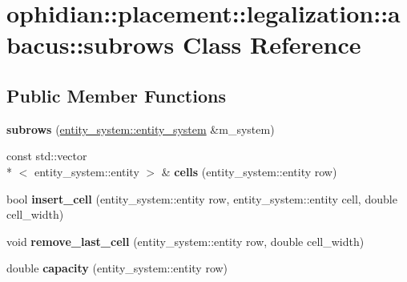 \hypertarget{classophidian_1_1placement_1_1legalization_1_1abacus_1_1subrows}{\section{ophidian\-:\-:placement\-:\-:legalization\-:\-:abacus\-:\-:subrows Class Reference}
\label{classophidian_1_1placement_1_1legalization_1_1abacus_1_1subrows}
}
\subsection*{Public Member Functions}
\begin{DoxyCompactItemize}
\item 
\hypertarget{classophidian_1_1placement_1_1legalization_1_1abacus_1_1subrows_ab568813c17e78b70616163d49576c6e0}{{\bfseries subrows} (\hyperlink{classophidian_1_1entity__system_1_1entity__system}{entity\-\_\-system\-::entity\-\_\-system} \&m\-\_\-system)}\label{classophidian_1_1placement_1_1legalization_1_1abacus_1_1subrows_ab568813c17e78b70616163d49576c6e0}

\item 
\hypertarget{classophidian_1_1placement_1_1legalization_1_1abacus_1_1subrows_a590ffbb00287ad59639b6c09955aa882}{const std\-::vector\\*
$<$ entity\-\_\-system\-::entity $>$ \& {\bfseries cells} (entity\-\_\-system\-::entity row)}\label{classophidian_1_1placement_1_1legalization_1_1abacus_1_1subrows_a590ffbb00287ad59639b6c09955aa882}

\item 
\hypertarget{classophidian_1_1placement_1_1legalization_1_1abacus_1_1subrows_a07c0431a0212ddcac97406a8d92ff477}{bool {\bfseries insert\-\_\-cell} (entity\-\_\-system\-::entity row, entity\-\_\-system\-::entity cell, double cell\-\_\-width)}\label{classophidian_1_1placement_1_1legalization_1_1abacus_1_1subrows_a07c0431a0212ddcac97406a8d92ff477}

\item 
\hypertarget{classophidian_1_1placement_1_1legalization_1_1abacus_1_1subrows_a985b7d1aa1d5f994d57a45c58e6178c5}{void {\bfseries remove\-\_\-last\-\_\-cell} (entity\-\_\-system\-::entity row, double cell\-\_\-width)}\label{classophidian_1_1placement_1_1legalization_1_1abacus_1_1subrows_a985b7d1aa1d5f994d57a45c58e6178c5}

\item 
\hypertarget{classophidian_1_1placement_1_1legalization_1_1abacus_1_1subrows_ae62799238131f0e9205b2fff9efbf1eb}{double {\bfseries capacity} (entity\-\_\-system\-::entity row)}\label{classophidian_1_1placement_1_1legalization_1_1abacus_1_1subrows_ae62799238131f0e9205b2fff9efbf1eb}


\end{DoxyCompactItemize}
